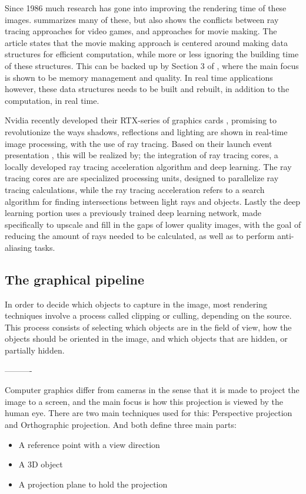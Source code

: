 Since 1986 much research has gone into improving the rendering time of these images. \cite{wald2009state} summarizes many of these, but also shows the conflicts between ray tracing approaches for video games, and approaches for movie making. The article states that the movie making approach is centered around making data structures for efficient computation, while more or less ignoring the building time of these structures. This can be backed up by Section 3 of \cite{carsmovie}, where the main focus is shown to be memory management and quality. In real time applications however, these data structures needs to be built and rebuilt, in addition to the computation, in real time. 

Nvidia recently developed their RTX-series of graphics cards \cite{raytraceblog}, promising to revolutionize the ways shadows, reflections and lighting are shown in real-time image processing, with the use of ray tracing. Based on their launch event presentation \cite{NvidiaConference}, this will be realized by; the integration of ray tracing cores, a locally developed ray tracing acceleration algorithm and deep learning. The ray tracing cores are are specialized processing units, designed to parallelize ray tracing calculations, while the ray tracing acceleration refers to a search algorithm for finding intersections between light rays and objects. Lastly the deep learning portion uses a previously trained deep learning network, made specifically to upscale and fill in the gaps of lower quality images, with the goal of reducing the amount of rays needed to be calculated, as well as to perform anti-aliasing tasks.

\subsection{The graphical pipeline}

In order to decide which objects to capture in the image, most rendering techniques involve a process called clipping or culling, depending on the source. This process consists of selecting which objects are in the field of view, how the objects should be oriented in the image, and which objects that are hidden, or partially hidden. 

----------

Computer graphics differ from cameras in the sense that it is made to project the image to a screen, and the main focus is how this projection is viewed by the human eye. There are two main techniques used for this: Perspective projection and Orthographic projection. And both define three main parts:
\begin{itemize}
    \item A reference point with a view direction
    \item A 3D object
    \item A projection plane to hold the projection
\end{itemize}

